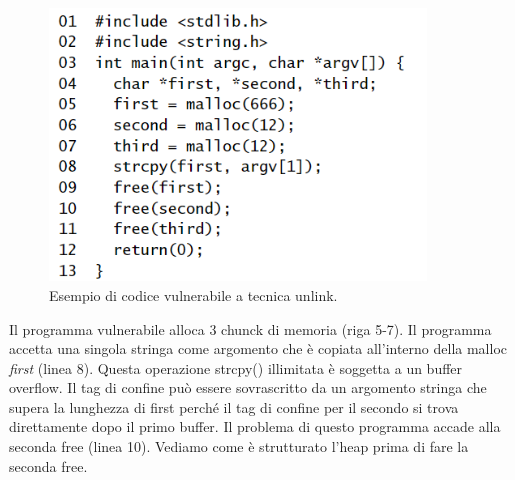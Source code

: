 \begin{figure}[H] 
	\centering
    \includegraphics[width=10cm, keepaspectratio]{santini/img/cap_4/unlink_buff_over.png}
	\caption{Esempio di codice vulnerabile a tecnica unlink.}\label{fig:ulink_buff_over}
\end{figure}

Il programma vulnerabile alloca 3 chunck di memoria (riga 5-7). Il programma accetta una singola stringa come argomento che è copiata all'interno della malloc \textit{first} (linea 8). Questa operazione strcpy() illimitata è soggetta a un buffer overflow. Il tag di confine può essere sovrascritto da un argomento stringa che supera la lunghezza di first perché il tag di confine per il secondo si trova direttamente dopo il primo buffer. Il problema di questo programma accade alla seconda free (linea 10). Vediamo come è strutturato l'heap prima di fare la seconda free.

